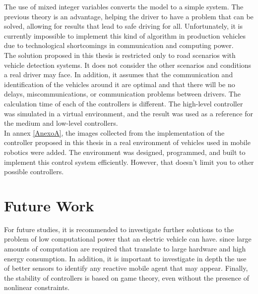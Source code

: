 The use of mixed integer variables converts the model to a simple system. The previous theory is an advantage, helping the driver to have a problem that can be solved, allowing for results that lead to safe driving for all.
Unfortunately, it is currently impossible to implement this kind of algorithm in production vehicles due to technological shortcomings in communication and computing power.
\\

The solution proposed in this thesis is restricted only to road scenarios with vehicle detection systems. It does not consider the other scenarios and conditions a real driver may face. In addition, it assumes that the communication and identification of the vehicles around it are optimal and that there will be no delays, miscommunications, or communication problems between drivers. The calculation time of each of the controllers is different. The high-level controller was simulated in a virtual environment, and the result was used as a reference for the medium and low-level controllers.
\\

In annex \ref{AnexoA}, the images collected from the implementation of the controller proposed in this thesis in a real environment of vehicles used in mobile robotics were added. The environment was designed, programmed, and built to implement this control system efficiently. However, that doesn't limit you to other possible controllers.

\section{Future Work}
For future studies, it is recommended to investigate further solutions to the problem of low computational power that an electric vehicle can have. since large amounts of computation are required that translate to large hardware and high energy consumption. In addition, it is important to investigate in depth the use of better sensors to identify any reactive mobile agent that may appear. Finally, the stability of controllers is based on game theory, even without the presence of nonlinear constraints.